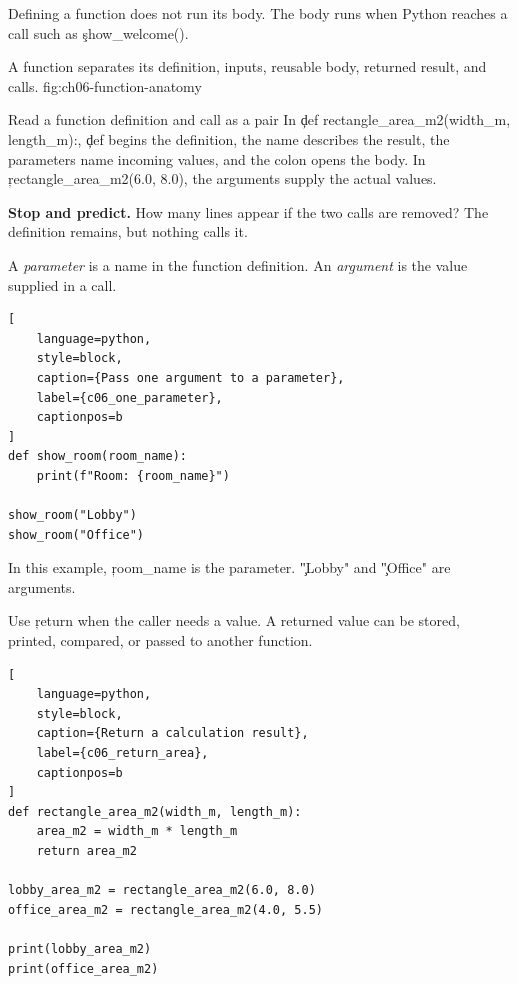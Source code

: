 Defining a function does not run its body. The body runs when Python reaches a
call such as \c{show_welcome()}.

{A function separates its definition, inputs, reusable body, returned result, and calls.}
{fig:ch06-function-anatomy}

\begin{SyntaxBox}{Read a function definition and call as a pair}
In \c{def rectangle_area_m2(width_m, length_m):}, \c{def} begins the
definition, the name describes the result, the parameters name incoming
values, and the colon opens the body. In
\c{rectangle_area_m2(6.0, 8.0)}, the arguments supply the actual values.
\end{SyntaxBox}

\begin{NoteBox}
\textbf{Stop and predict.} How many lines appear if the two calls are removed?
The definition remains, but nothing calls it.
\end{NoteBox}


A \emph{parameter} is a name in the function definition. An \emph{argument} is
the value supplied in a call.

\begin{lstlisting}[
    language=python,
    style=block,
    caption={Pass one argument to a parameter},
    label={c06_one_parameter},
    captionpos=b
]
def show_room(room_name):
    print(f"Room: {room_name}")

show_room("Lobby")
show_room("Office")
\end{lstlisting}

In this example, \c{room_name} is the parameter. \c{"Lobby"} and
\c{"Office"} are arguments.


Use \c{return} when the caller needs a value. A returned value can be stored,
printed, compared, or passed to another function.

\begin{lstlisting}[
    language=python,
    style=block,
    caption={Return a calculation result},
    label={c06_return_area},
    captionpos=b
]
def rectangle_area_m2(width_m, length_m):
    area_m2 = width_m * length_m
    return area_m2

lobby_area_m2 = rectangle_area_m2(6.0, 8.0)
office_area_m2 = rectangle_area_m2(4.0, 5.5)

print(lobby_area_m2)
print(office_area_m2)
\end{lstlisting}

